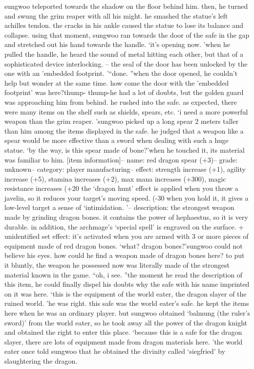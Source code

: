 sungwoo teleported towards the shadow on the floor behind him.
 then, he turned and swung the grim reaper with all his might.
he smashed the statue’s left achilles tendon.
 the cracks in his ankle caused the statue to lose its balance and collapse.
using that moment, sungwoo ran towards the door of the safe in the gap and stretched out his hand towards the handle.
‘it’s opening now.
’when he pulled the handle, he heard the sound of metal hitting each other, but that of a sophisticated device interlocking.
– the seal of the door has been unlocked by the one with an ’embedded footprint.
’“done.
”when the door opened, he couldn’t help but wonder at the same time.
how come the door with the ’embedded footprint’ was here?thump- thump-he had a lot of doubts, but the golden guard was approaching him from behind.
he rushed into the safe.
 as expected, there were many items on the shelf such as shields, spears, etc.
‘i need a more powerful weapon than the grim reaper.
’sungwoo picked up a long spear 2 meters taller than him among the items displayed in the safe.
 he judged that a weapon like a spear would be more effective than a sword when dealing with such a huge statue.
‘by the way, is this spear made of bone?’when he touched it, its material was familiar to him.
[item information]– name: red dragon spear (+3)– grade: unknown– category: player manufacturing– effect: strength increase (+1), agility increase (+5), stamina increases (+2), max mana increases (+300), magic resistance increases (+20%
 the ‘dragon hunt’ effect is applied when you throw a javelin, so it reduces your target’s moving speed.
 (-30%
 when you hold it, it gives a low-level target a sense of ‘intimidation.
’– description: the strongest weapon made by grinding dragon bones.
 it contains the power of hephaestus, so it is very durable.
 in addition, the archmage’s ‘special spell’ is engraved on the surface.
+ unidentified set effect: it’s activated when you are armed with 3 or more pieces of equipment made of red dragon bones.
‘what? dragon bones?’sungwoo could not believe his eyes.
 how could he find a weapon made of dragon bones here? to put it bluntly, the weapon he possessed now was literally made of the strongest material known in the game.
“oh, i see.
”the moment he read the description of this item, he could finally dispel his doubts why the safe with his name imprinted on it was here.
‘this is the equipment of the world eater, the dragon slayer of the ruined world.
’he was right.
 this safe was the world eater’s safe.
 he kept the items here when he was an ordinary player.
 but sungwoo obtained ‘balmung (the ruler’s sword)’ from the world eater, so he took away all the power of the dragon knight and obtained the right to enter this place.
‘because this is a safe for the dragon slayer, there are lots of equipment made from dragon materials here.
’the world eater once told sungwoo that he obtained the divinity called ‘siegfried’ by slaughtering the dragon.


